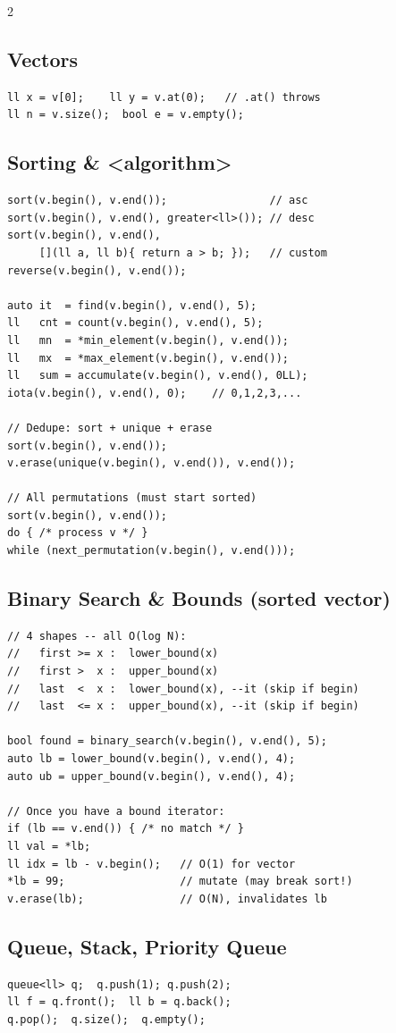\documentclass[10pt,letterpaper]{extarticle}
\newenvironment{block}[1]
  {\subsection*{#1}\nopagebreak}
  {\par\addvspace{2pt}}
\begin{document}
\begin{multicols*}{2}
\begin{block}{Vectors}
\begin{lstlisting}
ll x = v[0];    ll y = v.at(0);   // .at() throws
ll n = v.size();  bool e = v.empty();
\end{lstlisting}
\end{block}

\begin{block}{Sorting \& <algorithm>}
\begin{lstlisting}
sort(v.begin(), v.end());                // asc
sort(v.begin(), v.end(), greater<ll>()); // desc
sort(v.begin(), v.end(),
     [](ll a, ll b){ return a > b; });   // custom
reverse(v.begin(), v.end());

auto it  = find(v.begin(), v.end(), 5);
ll   cnt = count(v.begin(), v.end(), 5);
ll   mn  = *min_element(v.begin(), v.end());
ll   mx  = *max_element(v.begin(), v.end());
ll   sum = accumulate(v.begin(), v.end(), 0LL);
iota(v.begin(), v.end(), 0);    // 0,1,2,3,...

// Dedupe: sort + unique + erase
sort(v.begin(), v.end());
v.erase(unique(v.begin(), v.end()), v.end());

// All permutations (must start sorted)
sort(v.begin(), v.end());
do { /* process v */ }
while (next_permutation(v.begin(), v.end()));
\end{lstlisting}
\end{block}

\begin{block}{Binary Search \& Bounds (sorted vector)}
\begin{lstlisting}
// 4 shapes -- all O(log N):
//   first >= x :  lower_bound(x)
//   first >  x :  upper_bound(x)
//   last  <  x :  lower_bound(x), --it (skip if begin)
//   last  <= x :  upper_bound(x), --it (skip if begin)

bool found = binary_search(v.begin(), v.end(), 5);
auto lb = lower_bound(v.begin(), v.end(), 4);
auto ub = upper_bound(v.begin(), v.end(), 4);

// Once you have a bound iterator:
if (lb == v.end()) { /* no match */ }
ll val = *lb;
ll idx = lb - v.begin();   // O(1) for vector
*lb = 99;                  // mutate (may break sort!)
v.erase(lb);               // O(N), invalidates lb
\end{lstlisting}
\end{block}

\begin{block}{Queue, Stack, Priority Queue}
\begin{lstlisting}
queue<ll> q;  q.push(1); q.push(2);
ll f = q.front();  ll b = q.back();
q.pop();  q.size();  q.empty();


\end{lstlisting}
\end{block}
\end{multicols*}
\end{document}
